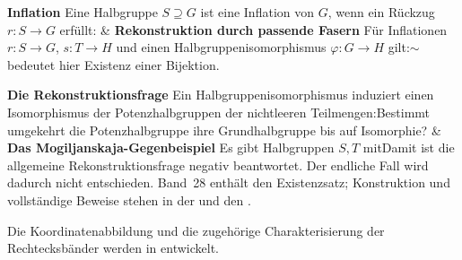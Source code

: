 \begin{BandUebersicht}
\textbf{Inflation}
Eine Halbgruppe \(S\supseteq G\) ist eine Inflation von \(G\),
wenn ein Rückzug \(r:S\to G\) erfüllt:
&
\textbf{Rekonstruktion durch passende Fasern}
Für Inflationen \(r:S\to G\), \(s:T\to H\) und
einen Halbgruppenisomorphismus \(\varphi:G\to H\) gilt:\(\sim\) bedeutet hier Existenz einer Bijektion.
 \\
\addlinespace[.8ex]

\textbf{Die Rekonstruktionsfrage}
Ein Halbgruppenisomorphismus induziert einen Isomorphismus der
Potenzhalbgruppen der nichtleeren Teilmengen:Bestimmt umgekehrt die Potenzhalbgruppe ihre Grundhalbgruppe
bis auf Isomorphie?
&
\textbf{Das Mogiljanskaja-Gegenbeispiel}
Es gibt Halbgruppen \(S,T\) mitDamit ist die allgemeine Rekonstruktionsfrage negativ
beantwortet. Der endliche Fall wird dadurch nicht entschieden.
Band~28 enthält den Existenzsatz; Konstruktion und vollständige Beweise
stehen in der \MogReadingLink{} und den \MogProofsLink{}.
 \\
\addlinespace[.8ex]
\end{BandUebersicht}

Die Koordinatenabbildung und die zugehörige Charakterisierung der
Rechtecksbänder werden in
\CoordinatesMainLink{}
entwickelt.
